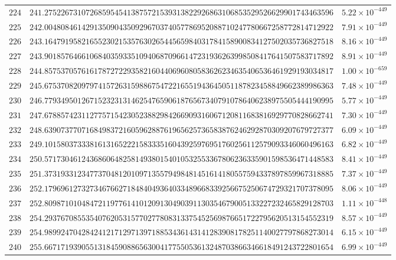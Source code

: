 \documentclass[12pt,reqno]{amsart}
\theoremstyle{remark}
\begin{document}
\begin{longtable}{clc}
$224$ & $241.2752267310726859545413875721539313822926863106853529526629901743463596$ & $5.22\times 10^{-449}$ \\
$225$ & $242.0048084614291350904350929670374057786952088710247780667258772814712922$ & $7.91\times 10^{-449}$ \\
$226$ & $243.1647919582165523021535763026544565984031784158900834127502035736827518$ & $8.16\times 10^{-449}$ \\
$227$ & $243.9018576466106840359335109406870966147231936263998508417641507583717892$ & $8.91\times 10^{-449}$ \\
$228$ & $244.8575370576161787272293582160440696080583626234635406536461929193034817$ & $1.00\times 10^{-659}$ \\
$229$ & $245.6753708209797415726315988675472216551943645051187823458849662389986363$ & $7.48\times 10^{-449}$ \\
$230$ & $246.7793495012671523231314625476590618765673407910786406238975505444190995$ & $5.77\times 10^{-449}$ \\
$231$ & $247.6788574231127757154230523882984266909316067120811683816929770828662741$ & $7.30\times 10^{-449}$ \\
$232$ & $248.6390737707168498372160596288761965625736583876246292870309207679727377$ & $6.09\times 10^{-449}$ \\
$233$ & $249.1015803733381613165222158333516043925976951760256112579093346060496163$ & $6.82\times 10^{-449}$ \\
$234$ & $250.5717304612436860648258149380154010532553367806236335901598536471448583$ & $8.41\times 10^{-449}$ \\
$235$ & $251.3731933123477370481201097135579498481451614180557594337897859967318885$ & $7.37\times 10^{-449}$ \\
$236$ & $252.1796961273273467662718484049364033489668339256675250674729321707378095$ & $8.06\times 10^{-449}$ \\
$237$ & $252.8098710104847211977614101209130490391130354679005133227232465829128703$ & $1.11\times 10^{-448}$ \\
$238$ & $254.2937670855354076205315770277808313375452569876651722795620513154552319$ & $8.57\times 10^{-449}$ \\
$239$ & $254.9899247042842412171297139718853436143141283908178251140027797868273014$ & $6.15\times 10^{-449}$ \\
$240$ & $255.6671719390551318459088656300417755053613248703866346618491243722801654$ & $6.99\times 10^{-449}$ \\

\end{longtable}
\end{document}
